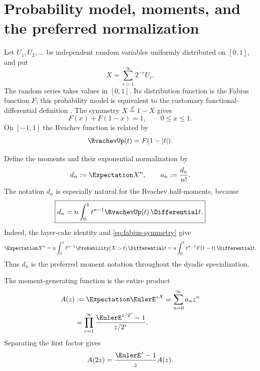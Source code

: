 \documentclass[11pt,oneside]{book}
\numberwithin{equation}{chapter}
\theoremstyle{definition}
\theoremstyle{remark}
\begin{document}
\section{Probability model, moments, and the preferred normalization}

Let $U_1,U_2,\ldots$ be independent random variables uniformly distributed
on $[0,1]$, and put
\begin{equation}
 X=\sum_{r=1}^{\infty}2^{-r}U_r.
 \label{eq:fabius-random-series}
\end{equation}
The random series takes values in $[0,1]$.  Its distribution function is the
Fabius function $F$; this probability model is equivalent to the customary
functional-differential definition \cite{Fabius1966,Arias2017Definition}.
The symmetry $X\overset d=1-X$ gives
\begin{equation}
 F(x)+F(1-x)=1,
 \qquad 0\le x\le1.
 \label{eq:fabius-symmetry}
\end{equation}
On $[-1,1]$ the Rvachev function is related by
\begin{equation}
 \RvachevUp(t)=F(1-|t|).
 \label{eq:up-fabius-relation}
\end{equation}

Define the moments and their exponential normalization by
\begin{equation}
 d_n:=\Expectation X^n,
 \qquad
 a_n:=\frac{d_n}{n!}.
 \label{eq:fabius-moment-normalization}
\end{equation}
The notation $d_n$ is especially natural for the Rvachev half-moments,
because
\begin{equation}
 \boxed{
 d_n=n\int_0^1t^{n-1}\RvachevUp(t)\,\Differential t.}
 \label{eq:preferred-half-moment}
\end{equation}
Indeed, the layer-cake identity and \eqref{eq:fabius-symmetry} give
\[
 \Expectation X^n=n\int_0^1t^{n-1}\Probability(X>t)\,\Differential t
       =n\int_0^1t^{n-1}F(1-t)\,\Differential t.
\]
Thus $d_n$ is the preferred moment notation throughout the dyadic
specialization.

The moment-generating function is the entire product
\begin{align}
 A(z)&:=\Expectation\EulerE^{zX}=\sum_{n=0}^{\infty}a_nz^n
 \label{eq:fabius-mgf-series}\\
 &=\prod_{r=1}^{\infty}
   \frac{\EulerE^{z/2^r}-1}{z/2^r}.
 \label{eq:fabius-mgf-product}
\end{align}
Separating the first factor gives
\begin{equation}
 A(2z)=\frac{\EulerE^z-1}{z}A(z).
 \label{eq:fabius-mgf-functional}
\end{equation}
\end{document}
